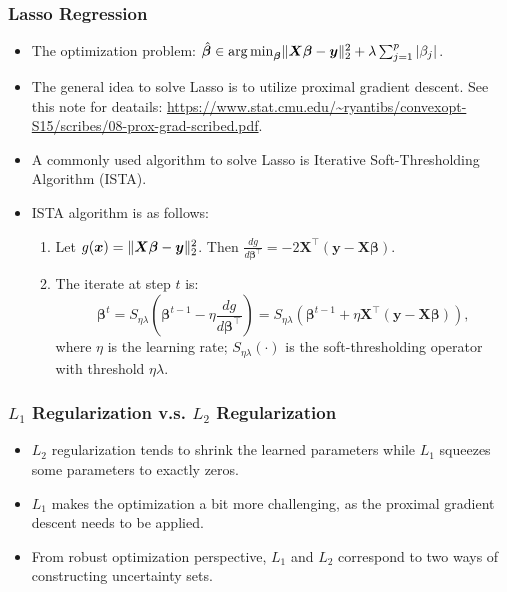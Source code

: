     \subsubsection{Lasso Regression}
        \begin{itemize}
            \item The optimization problem: $\hat{\bm{\beta}} \in \operatorname{arg\,min}_{\bm{\beta}} \lVert\bm{X} \bm{\beta} - \bm{y}\rVert_2^2 + \lambda \sum_{j=1}^{p}{| \beta_j |}$.
            \item The general idea to solve Lasso is to utilize proximal gradient descent.
            See this note for deatails: \url{https://www.stat.cmu.edu/~ryantibs/convexopt-S15/scribes/08-prox-grad-scribed.pdf}.
            \item A commonly used algorithm to solve Lasso is Iterative Soft-Thresholding Algorithm (ISTA). 
            \item ISTA algorithm is as follows:
                \begin{enumerate}
                    \item Let $g(\bm{x}) = \lVert\bm{X} \bm{\beta} - \bm{y}\rVert_2^2$. Then $\frac{d g}{d \bm{\beta}^\top} = -2\bm{X}^\top(\bm{y} - \bm{X}\bm{\beta})$.
                    \item The iterate at step $t$ is:
                        \begin{equation}
                            \bm{\beta}^t = S_{\eta \lambda}\left( 
                                \bm{\beta}^{t-1} - \eta \frac{d g}{d \bm{\beta}^\top} 
                            \right) = S_{\eta \lambda}\left( 
                                \bm{\beta}^{t-1} + \eta \bm{X}^\top(\bm{y} - \bm{X}\bm{\beta}) 
                            \right),
                        \end{equation}
                    where $\eta$ is the learning rate; $S_{\eta \lambda}(\cdot)$ is the soft-thresholding operator with threshold $\eta \lambda$. 
                \end{enumerate}
        \end{itemize}
    
    \subsubsection{$L_1$ Regularization v.s. $L_2$ Regularization}
        \begin{itemize}
            \item $L_2$ regularization tends to shrink the learned parameters while $L_1$ squeezes some parameters to exactly zeros.
            \item $L_1$ makes the optimization a bit more challenging, as the proximal gradient descent needs to be applied.
            \item From robust optimization perspective, $L_1$ and $L_2$ correspond to two ways of constructing uncertainty sets. 
        \end{itemize}
    
